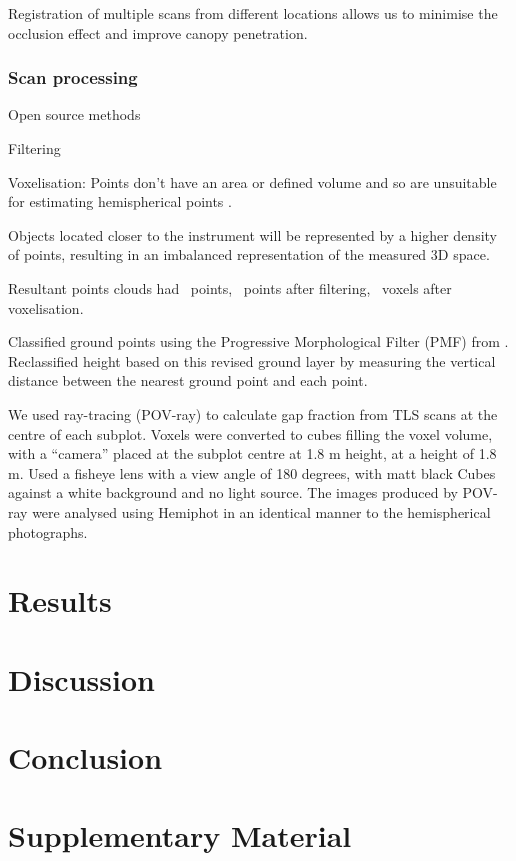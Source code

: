 \documentclass[11pt,a4paper]{article}
\newcommand{\beginsupplement}{%
	\setcounter{table}{0}
	\renewcommand{\thetable}{S\arabic{table}}%
	\setcounter{figure}{0}
	\renewcommand{\thefigure}{S\arabic{figure}}%
}
\begin{document}
Registration of multiple scans from different locations allows us to minimise
the occlusion effect and improve canopy penetration.

\subsubsection{Scan processing}

Open source methods

Filtering

Voxelisation: Points don't have an area or defined volume and so are unsuitable
for estimating hemispherical points \citep{Seidel2012}.

Objects located closer to the instrument will be represented by a higher density
of points, resulting in an imbalanced representation of the measured 3D space.

Resultant points clouds had ~points, ~points after filtering, ~voxels after
voxelisation.

Classified ground points using the Progressive Morphological Filter (PMF) from
\citep{Zhang2003}. Reclassified height based on this revised ground layer by
measuring the vertical distance between the nearest ground point and each point.

We used ray-tracing (POV-ray) to calculate gap fraction from TLS scans at the
centre of each subplot. Voxels were converted to cubes filling the voxel volume,
with a ``camera'' placed at the subplot centre at 1.8 m height, at a height of
1.8 m. Used a fisheye lens with a view angle of 180 degrees, with matt black
Cubes against a white background and no light source. The images produced by
POV-ray were analysed using Hemiphot in an identical manner to the hemispherical
photographs.

\section{Results}

\section{Discussion}

\section{Conclusion}

\printbibliography

\section{Supplementary Material} \beginsupplement
\end{document}
